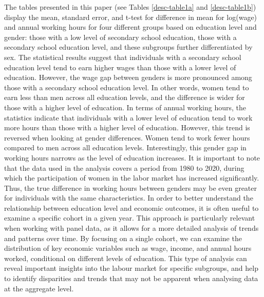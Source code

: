 \documentclass[14pt]{sistedes}
\begin{document}
The tables presented in this paper (see Tables \ref{desc-table1a} and \ref{desc-table1b}) display the mean, standard error, and t-test for difference in mean for log(wage) and annual working hours for four different groups based on education level and gender: those with a low level of secondary school education, those with a secondary school education level, and these subgroups further differentiated by sex. The statistical results suggest that individuals with a secondary school education level tend to earn higher wages than those with a lower level of education. However, the wage gap between genders is more pronounced among those with a secondary school education level. In other words, women tend to earn less than men across all education levels, and the difference is wider for those with a higher level of education.
\newline
In terms of annual working hours, the statistics indicate that individuals with a lower level of education tend to work more hours than those with a higher level of education. However, this trend is reversed when looking at gender differences. Women tend to work fewer hours compared to men across all education levels. Interestingly, this gender gap in working hours narrows as the level of education increases. It is important to note that the data used in the analysis covers a period from 1980 to 2020, during which the participation of women in the labor market has increased significantly. Thus, the true difference in working hours between genders may be even greater for individuals with the same characteristics.\newline
In order to better understand the relationship between education level and economic outcomes, it is often useful to examine a specific cohort in a given year. This approach is particularly relevant when working with panel data, as it allows for a more detailed analysis of trends and patterns over time. By focusing on a single cohort, we can examine the distribution of key economic variables such as wage, income, and annual hours worked, conditional on different levels of education. This type of analysis can reveal important insights into the labour market for specific subgroups, and help to identify disparities and trends that may not be apparent when analysing data at the aggregate level.
\newline
\end{document}
